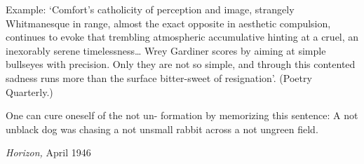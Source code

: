 \begin{readnote}
[2] Example: ‘Comfort’s catholicity of perception and image, strangely Whitmanesque in range, almost the exact opposite in aesthetic compulsion, continues to evoke that trembling atmospheric accumulative hinting at a cruel, an inexorably serene timelessness… Wrey Gardiner scores by aiming at simple bullseyes with precision. Only they are not so simple, and through this contented sadness runs more than the surface bitter-sweet of resignation’. (Poetry Quarterly.)
\end{readnote}

\begin{readnote}
[3] One can cure oneself of the not un- formation by memorizing this sentence: A not unblack dog was chasing a not unsmall rabbit across a not ungreen field.
\end{readnote}

\textit{Horizon, }April 1946\par

\endgroup
